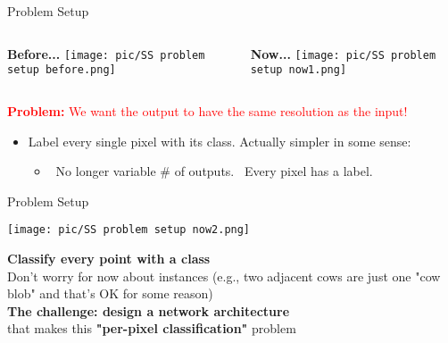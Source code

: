 \documentclass[serif, aspectratio=169]{beamer}
\begin{document}
\begin{frame}{Problem Setup}
    \vspace{-0.1cm}

    \begin{columns}[t] %
        \begin{column}{0.5\textwidth}
            \textbf{Before...} %
            \vspace{0.2cm}
            \texttt{[image: pic/SS problem setup before.png]}
        \end{column}
        
        \begin{column}{0.5\textwidth}
            \textbf{Now...}
            \vspace{0.2cm}
            \texttt{[image: pic/SS problem setup now1.png]} 
        \end{column}
    \end{columns}
    
     \textbf{\textcolor{red}{Problem:}} \textcolor{red}{We want the output to have the same resolution as the input!}
    \begin{itemize}
        \item Label every single pixel with its class. Actually simpler in some sense:
        \begin{itemize}
            \item[] \textbullet \ No longer variable \# of outputs. \hspace{1em}\textbullet \ Every pixel has a label.
        \end{itemize}
    \end{itemize}

\end{frame}


\begin{frame}{Problem Setup}
    \begin{center}
        \texttt{[image: pic/SS problem setup now2.png]}
    \end{center}
    
    
    \begin{minipage}{0.9\textwidth}\footnotesize
        \textbf{Classify every point with a class} \\
        Don't worry for now about instances (e.g., two adjacent cows are just one "cow blob" and that’s OK for some reason)\\

                
        \textbf{The challenge: design a network architecture} \\
        that makes this \textbf{"per-pixel classification"} problem  \color{deepblue}{computationally tractable}
    \end{minipage}
\end{frame}
\end{document}
